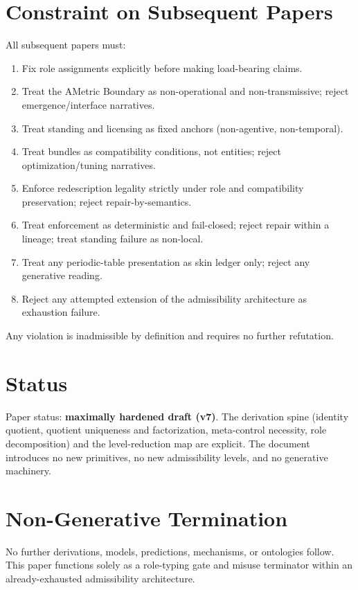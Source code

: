 \documentclass[12pt]{article}
\theoremstyle{plain}
\begin{document}
\section{Constraint on Subsequent Papers}

All subsequent papers must:

\begin{enumerate}[leftmargin=*]
\item Fix role assignments explicitly before making load-bearing claims.
\item Treat the AMetric Boundary as non-operational and non-transmissive; reject emergence/interface narratives.
\item Treat standing and licensing as fixed anchors (non-agentive, non-temporal).
\item Treat bundles as compatibility conditions, not entities; reject optimization/tuning narratives.
\item Enforce redescription legality strictly under role and compatibility preservation; reject repair-by-semantics.
\item Treat enforcement as deterministic and fail-closed; reject repair within a lineage; treat standing failure as non-local.
\item Treat any periodic-table presentation as skin ledger only; reject any generative reading.
\item Reject any attempted extension of the admissibility architecture as exhaustion failure.
\end{enumerate}

Any violation is inadmissible by definition and requires no further refutation.

\section{Status}

Paper status: \textbf{maximally hardened draft (v7)}. The derivation spine (identity quotient, quotient uniqueness and factorization, meta-control necessity, role decomposition) and the level-reduction map are explicit. The document introduces no new primitives, no new admissibility levels, and no generative machinery.

\section{Non-Generative Termination}

No further derivations, models, predictions, mechanisms, or ontologies follow. This paper functions solely as a role-typing gate and misuse terminator within an already-exhausted admissibility architecture.
\end{document}
